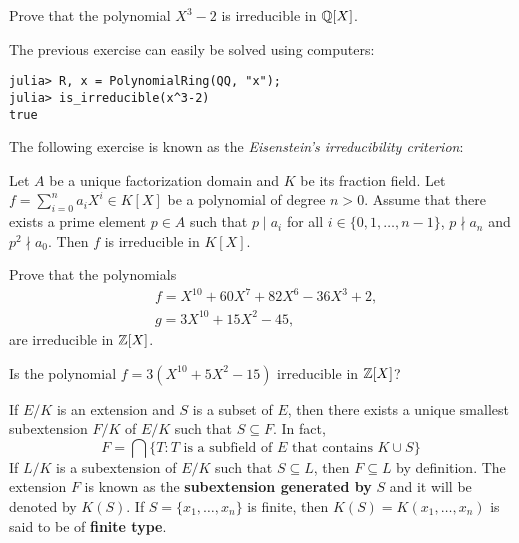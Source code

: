 \begin{exercise}
    Prove that the polynomial $X^3-2$ is irreducible in $\mathbb{Q}[X]$.  
\end{exercise}

The previous exercise can easily be solved using
computers: 
\begin{lstlisting}
julia> R, x = PolynomialRing(QQ, "x");
julia> is_irreducible(x^3-2)
true
\end{lstlisting}

The following exercise is known as the 
\emph{Eisenstein's irreducibility criterion}:

\begin{exercise}
    Let $A$ be a unique factorization domain and $K$ be its fraction field. 
    Let $f=\sum_{i=0}^n a_iX^i\in K[X]$ be a polynomial of degree $n>0$. 
    Assume that there exists a prime element $p\in A$ such that
    $p\mid a_i$ for all $i\in\{0,1,\dots,n-1\}$, $p\nmid a_n$ and
    $p^2\nmid a_0$. Then $f$ is irreducible in $K[X]$. 
\end{exercise}

\begin{exercise}
    Prove that
    the polynomials 
    \begin{align*}
    &f=X^{10}+60X^7+82X^6-36X^3+2,\\
    &g=3X^{10}+15X^2-45, 
    \end{align*}
    are irreducible in $\mathbb{Z}[X]$. 
\end{exercise}

\begin{exercise}
    Is the polynomial $f=3(X^{10}+5X^2-15)$ irreducible in $\mathbb{Z}[X]$? 
\end{exercise}


If $E/K$ is an extension and $S$ is a subset of $E$, then
there exists a unique smallest 
subextension $F/K$ of $E/K$ such that
$S\subseteq F$. In fact, 
\[
	F=\bigcap\{T:\text{$T$ is a subfield of $E$ that contains $K\cup S$}\} 
\]
If $L/K$ is a subextension of $E/K$ such that 
$S\subseteq L$, then $F\subseteq L$ by definition. The 
extension $F$ is known as the \textbf{subextension generated by} 
$S$ and
it will be denoted by $K(S)$. 
If $S=\{x_1,\dots,x_n\}$ is finite,
then $K(S)=K(x_1,\dots,x_n)$ is said to be of \textbf{finite type}. 

